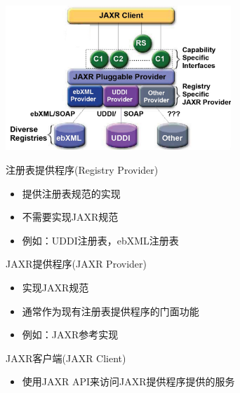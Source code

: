 \begin{table}
    \centering
    \includegraphics[width=8.5cm]{images/JAXR.png}
    \vspace{-5.5em}
\end{table}
注册表提供程序(Registry Provider)
\begin{itemize}
    \item 提供注册表规范的实现
    \item 不需要实现JAXR规范
    \item 例如：UDDI注册表，ebXML注册表
\end{itemize}

JAXR提供程序(JAXR Provider)
\begin{itemize}
    \item 实现JAXR规范
    \item 通常作为现有注册表提供程序的门面功能
    \item 例如：JAXR参考实现
\end{itemize}

JAXR客户端(JAXR Client)
\begin{itemize}
    \item 使用JAXR API来访问JAXR提供程序提供的服务
\end{itemize}
